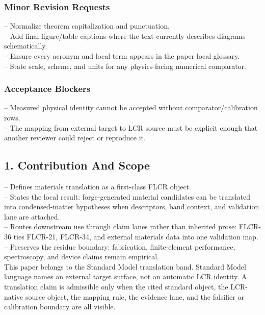 \documentclass[11pt]{article}
\begin{document}
\subsubsection*{Minor Revision Requests}

\noindent{}-- Normalize theorem capitalization and punctuation.\\
\noindent{}-- Add final figure/table captions where the text currently describes diagrams schematically.\\
\noindent{}-- Ensure every acronym and local term appears in the paper-local glossary.\\
\noindent{}-- State scale, scheme, and units for any physics-facing numerical comparator.\\

\subsubsection*{Acceptance Blockers}

\noindent{}-- Measured physical identity cannot be accepted without comparator/calibration rows.\\
\noindent{}-- The mapping from external target to LCR source must be explicit enough that another reviewer could reject or reproduce it.\\


\subsection*{1. Contribution And Scope}

\noindent{}-- Defines materials translation as a first-class FLCR object.\\
\noindent{}-- States the local result: forge-generated material candidates can be translated into condensed-matter hypotheses when descriptors, band context, and validation lane are attached.\\
\noindent{}-- Routes downstream use through claim lanes rather than inherited prose: FLCR-36 ties FLCR-21, FLCR-34, and external materials data into one validation map.\\
\noindent{}-- Preserves the residue boundary: fabrication, finite-element performance, spectroscopy, and device claims remain empirical.\\

This paper belongs to the Standard Model translation band. Standard Model language names an external target surface, not an automatic LCR identity. A translation claim is admissible only when the cited standard object, the LCR-native source object, the mapping rule, the evidence lane, and the falsifier or calibration boundary are all visible.
\end{document}

